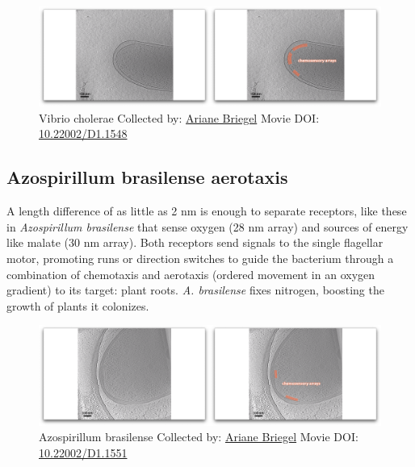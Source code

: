 \documentclass[]{tufte-book}
\begin{document}
\begin{figure}
\includegraphics{movie_stills/7_4} \caption[Vibrio cholerae Collected by:
\protect\hyperlink{ariane_briegel}{Ariane Briegel} Movie DOI:
\href{https://doi.org/10.22002/D1.1548}{10.22002/D1.1548}]{Vibrio cholerae Collected by:
\protect\hyperlink{ariane_briegel}{Ariane Briegel} Movie DOI:
\href{https://doi.org/10.22002/D1.1548}{10.22002/D1.1548}}\label{fig:7-4}
\end{figure}

\hypertarget{Azospirillum_brasilense_aerotaxis}{\subsection{Azospirillum
brasilense aerotaxis}\label{Azospirillum_brasilense_aerotaxis}}

A length difference of as little as 2 nm is enough to separate
receptors, like these in \emph{Azospirillum brasilense} that sense
oxygen (28 nm array) and sources of energy like malate (30 nm array).
Both receptors send signals to the single flagellar motor, promoting
runs or direction switches to guide the bacterium through a combination
of chemotaxis and aerotaxis (ordered movement in an oxygen gradient) to
its target: plant roots. \emph{A. brasilense} fixes nitrogen, boosting
the growth of plants it colonizes.





\begin{figure}
\includegraphics{movie_stills/7_4a} \caption[Azospirillum brasilense Collected by:
\protect\hyperlink{ariane_briegel}{Ariane Briegel} Movie DOI:
\href{https://doi.org/10.22002/D1.1551}{10.22002/D1.1551}]{Azospirillum brasilense Collected by:
\protect\hyperlink{ariane_briegel}{Ariane Briegel} Movie DOI:
\href{https://doi.org/10.22002/D1.1551}{10.22002/D1.1551}}\label{fig:7-4a}
\end{figure}
\end{document}
